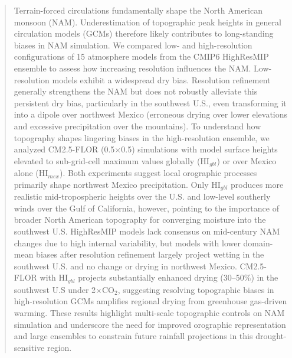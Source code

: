 \documentclass[draft]{agujournal2019}
\begin{document}
\begin{abstract} %
Terrain-forced circulations fundamentally shape the North American monsoon (NAM). Underestimation of topographic peak heights in general circulation models (GCMs) therefore likely contributes to long-standing biases in NAM simulation. We compared low- and high-resolution configurations of 15 atmosphere models from the CMIP6 HighResMIP ensemble to assess how increasing resolution influences the NAM. Low-resolution models exhibit a widespread dry bias. Resolution refinement generally strengthens the NAM but does not robustly alleviate this persistent dry bias, particularly in the southwest U.S., even transforming it into a dipole over northwest Mexico (erroneous drying over lower elevations and excessive precipitation over the mountains). To understand how topography shapes lingering biases in the high-resolution ensemble, we analyzed CM2.5-FLOR (0.5\textdegree{}$\times$0.5\textdegree{}) simulations with model surface heights elevated to sub-grid-cell maximum values globally (HI$_{gbl}$) or over Mexico alone (HI$_{mex}$). Both experiments suggest local orographic processes primarily shape northwest Mexico precipitation. Only HI$_{gbl}$ produces more realistic mid-tropospheric heights over the U.S. and low-level southerly winds over the Gulf of California, however, pointing to the importance of broader North American topography for converging moisture into the southwest U.S. HighResMIP models lack consensus on mid-century NAM changes due to high internal variability, but models with lower domain-mean biases after resolution refinement largely project wetting in the southwest U.S. and no change or drying in northwest Mexico. CM2.5-FLOR with HI$_{gbl}$ projects substantially enhanced drying (30–50\%) in the southwest U.S under 2$\times$CO$_2$, suggesting resolving topographic biases in high-resolution GCMs amplifies regional drying from greenhouse gas-driven warming. These results highlight multi-scale topographic controls on NAM simulation and underscore the need for improved orographic representation and large ensembles to constrain future rainfall projections in this drought-sensitive region.
\end{abstract}
\end{document}
